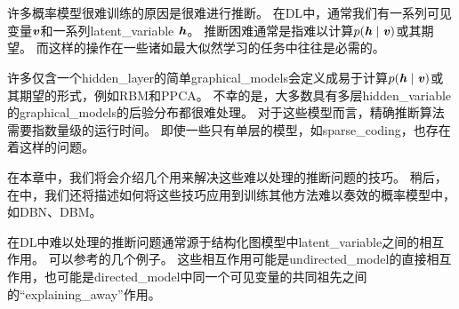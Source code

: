 \chapter{}
\label{chap:approximate_inference}


许多概率模型很难训练的原因是很难进行推断。
在\gls{DL}中，通常我们有一系列可见变量$\boldsymbol{\mathit{v}}$和一系列\gls{latent_variable} $\boldsymbol{\mathit{h}}$。
推断困难通常是指难以计算$p(\boldsymbol{\mathit{h}}\mid\boldsymbol{\mathit{v}})$或其期望。
而这样的操作在一些诸如最大似然学习的任务中往往是必需的。


许多仅含一个\gls{hidden_layer}的简单\gls{graphical_models}会定义成易于计算$p(\boldsymbol{\mathit{h}}\mid\boldsymbol{\mathit{v}})$或其期望的形式，例如\gls{RBM}和\gls{PPCA}。
不幸的是，大多数具有多层\gls{hidden_variable}的\gls{graphical_models}的后验分布都很难处理。
对于这些模型而言，精确推断算法需要指数量级的运行时间。
即使一些只有单层的模型，如\gls{sparse_coding}，也存在着这样的问题。


在本章中，我们将会介绍几个用来解决这些难以处理的推断问题的技巧。
稍后，在中，我们还将描述如何将这些技巧应用到训练其他方法难以奏效的概率模型中，如\gls{DBN}、\gls{DBM}。


在\gls{DL}中难以处理的推断问题通常源于结构化图模型中\gls{latent_variable}之间的相互作用。
可以参考的几个例子。
这些相互作用可能是\gls{undirected_model}的直接相互作用，也可能是\gls{directed_model}中同一个可见变量的共同祖先之间的``\gls{explaining_away}''作用。



